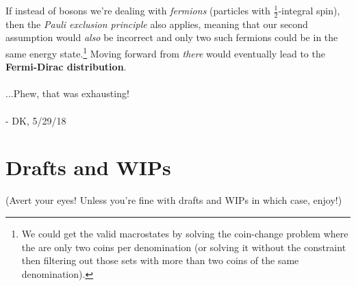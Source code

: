 \documentclass[letterpaper,12pt]{report}
\begin{document}
If instead of bosons we're dealing with \emph{fermions} (particles with
\(\frac{1}{2}\)-integral spin), then the \emph{Pauli exclusion principle} also applies,
meaning that our second assumption would \emph{also} be incorrect and only two such
fermions could be in the same energy state.\footnote{
  We could get the valid macrostates
  by solving the coin-change problem where the are only two coins per denomination
  (or solving it without the constraint then filtering out those sets with more than
  two coins of the same denomination).
}
Moving forward from \emph{there} would
eventually lead to the \textbf{Fermi-Dirac distribution}.
\\
\\
...Phew, that was exhausting!
\\
\\
- DK, 5/29/18


\chapter{Drafts and WIPs}\label{drafts-and-wips}

(Avert your eyes! Unless you're fine with drafts and WIPs \textemdash{} in which case, enjoy!)







\end{document}
